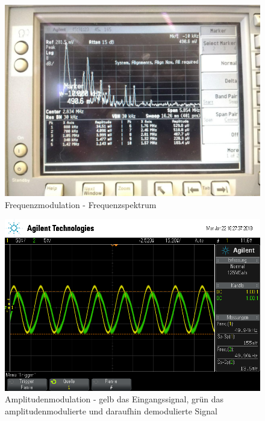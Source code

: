 \begin{figure}
	\centering
	\includegraphics[width=\textwidth]{img/Aufgabenteil_d.jpg}
	\caption{Frequenzmodulation - Frequenzspektrum}
\end{figure}

\begin{figure}
	\centering
	\includegraphics[width=\textwidth]{img/f_scope_235.png}
	\caption{Amplitudenmodulation - gelb das Eingangssignal, grün das amplitudenmodulierte und daraufhin demodulierte Signal}
\end{figure}

